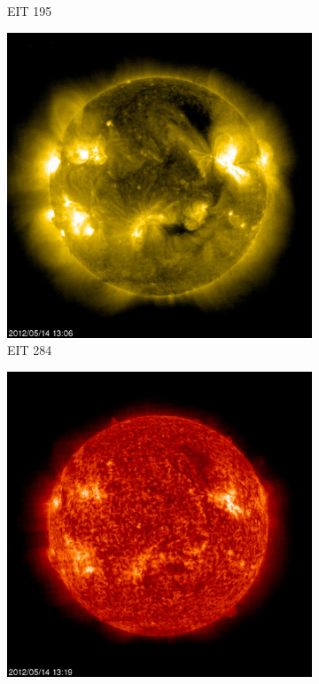 \documentclass{article}
\begin{document}
\begin{figure}[h!tb]
\begin{subfigure}[b]{0.16\linewidth}
		\caption{EIT 195}
		\label{fig:SOHOEIT195}
	\end{subfigure}
	\begin{subfigure}[b]{0.16\linewidth}
		\centering
		\includegraphics[width=\textwidth]{Figures/SOHOEIT284.jpg}
		\caption{EIT 284}
		\label{fig:SOHOEIT284}
	\end{subfigure}
	\begin{subfigure}[b]{0.16\linewidth}
		\centering
		\includegraphics[width=\textwidth]{Figures/SOHOEIT304.jpg}

\end{subfigure}
\end{figure}
\end{document}
